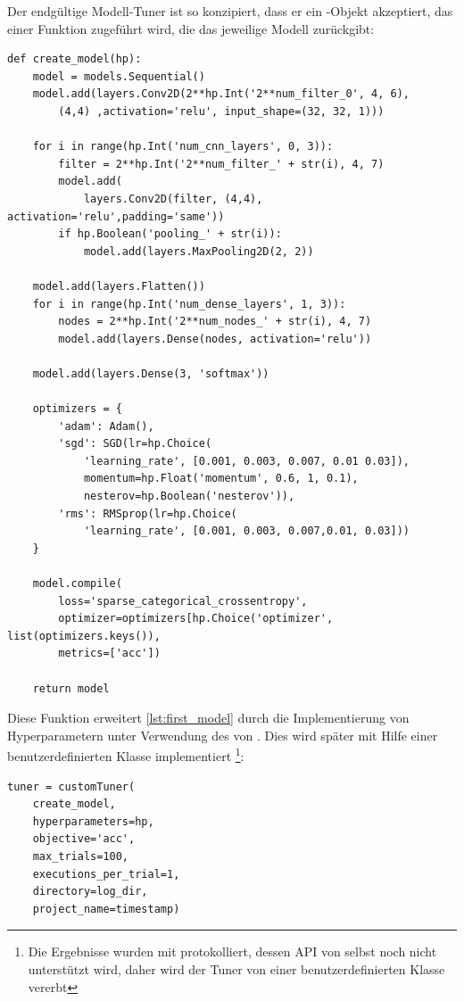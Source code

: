 Der endgültige Modell-Tuner ist so konzipiert, dass er ein -Objekt akzeptiert, das einer Funktion zugeführt wird, die das jeweilige Modell zurückgibt:


\begin{lstlisting}
def create_model(hp):
    model = models.Sequential()
    model.add(layers.Conv2D(2**hp.Int('2**num_filter_0', 4, 6),
        (4,4) ,activation='relu', input_shape=(32, 32, 1)))

    for i in range(hp.Int('num_cnn_layers', 0, 3)):
        filter = 2**hp.Int('2**num_filter_' + str(i), 4, 7)
        model.add(
            layers.Conv2D(filter, (4,4), activation='relu',padding='same'))
        if hp.Boolean('pooling_' + str(i)):
            model.add(layers.MaxPooling2D(2, 2))

    model.add(layers.Flatten())
    for i in range(hp.Int('num_dense_layers', 1, 3)):
        nodes = 2**hp.Int('2**num_nodes_' + str(i), 4, 7)
        model.add(layers.Dense(nodes, activation='relu'))
    
    model.add(layers.Dense(3, 'softmax'))

    optimizers = {
        'adam': Adam(),
        'sgd': SGD(lr=hp.Choice(
            'learning_rate', [0.001, 0.003, 0.007, 0.01 0.03]),
            momentum=hp.Float('momentum', 0.6, 1, 0.1),
            nesterov=hp.Boolean('nesterov')),
        'rms': RMSprop(lr=hp.Choice(
            'learning_rate', [0.001, 0.003, 0.007,0.01, 0.03]))
    }

    model.compile(
        loss='sparse_categorical_crossentropy',
        optimizer=optimizers[hp.Choice('optimizer', list(optimizers.keys()),
        metrics=['acc'])

    return model
\end{lstlisting}

Diese Funktion erweitert \ref{lst:first_model} durch die Implementierung von Hyperparametern unter Verwendung des  von .
Dies wird später mit Hilfe einer benutzerdefinierten Klasse implementiert \footnote{Die Ergebnisse wurden mit  protokolliert, dessen API von  selbst noch nicht unterstützt wird, daher wird der Tuner von einer benutzerdefinierten Klasse vererbt}:

\begin{lstlisting}
tuner = customTuner(
    create_model,
    hyperparameters=hp,
    objective='acc',
    max_trials=100,
    executions_per_trial=1,
    directory=log_dir,
    project_name=timestamp)
\end{lstlisting}

